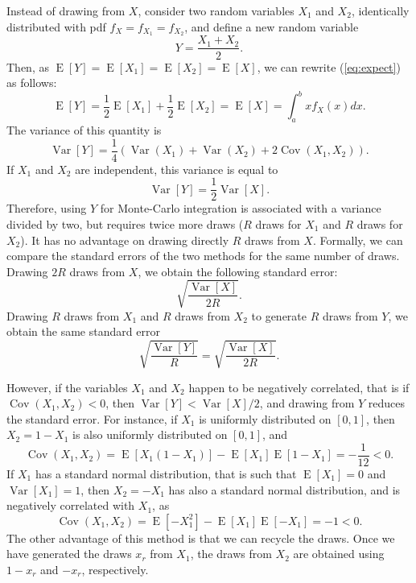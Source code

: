 \documentclass[12pt,a4paper]{article}
\newcommand{\req}[1]{(\ref{#1})}
\newcommand{\expect}{\operatorname{E}}
\newcommand{\var}{\operatorname{Var}}
\newcommand{\cov}{\operatorname{Cov}}
\begin{document}
Instead of drawing from $X$, consider two random variables $X_1$ and $X_2$, identically distributed
with pdf $f_X=f_{X_1}=f_{X_2}$, and define a new random variable
\begin{equation}
Y = \frac{X_1+X_2}{2}.
\end{equation}
 Then, as
$\expect[Y]=\expect[X_1]=\expect[X_2]=\expect[X]$, we can rewrite \req{eq:expect}
as follows:
\begin{equation}
\expect[Y] = \frac{1}{2} \expect[X_1] +
\frac{1}{2} \expect[X_2] = \expect[X] = \int_{a}^{b} x f_X(x) dx.
\end{equation}
The variance of this quantity is 
\begin{equation}
\label{eq:varY}
\var[Y] = \frac{1}{4}(\var(X_1)+\var(X_2)+2\cov(X_1,X_2)).
\end{equation}
If $X_1$ and $X_2$  are independent, this variance is equal to
\begin{equation}
\var[Y] = \frac{1}{2}\var[X].
\end{equation}
Therefore, using $Y$ for Monte-Carlo integration is associated with a
variance divided by two, but requires twice more draws ($R$ draws for $X_1$
and $R$ draws for $X_2$). It has no advantage on drawing directly $R$
draws from $X$. Formally, we can compare the standard errors of the
two methods for the same number of draws. Drawing $2R$ draws from $X$,
we obtain the following standard error:
\begin{equation}
\sqrt{\frac{\var[X]}{2R}}.
\end{equation}
Drawing $R$ draws from $X_1$ and $R$ draws from $X_2$ to generate $R$
draws from $Y$, we obtain the
same standard error
\begin{equation}
\sqrt{\frac{\var[Y]}{R}} = \sqrt{\frac{\var[X]}{2R}}. 
\end{equation}

 However, if the variables $X_1$ and
$X_2$ happen to be negatively correlated, that is if $\cov(X_1,X_2) <
0$, then $\var[Y] < \var[X] / 2$, and drawing from $Y$ reduces the
standard error. For instance, if $X_1$ is uniformly
distributed on $[0,1]$, then $X_2=1-X_1$ is also uniformly
distributed on $[0,1]$, and 
\begin{equation}
\cov(X_1,X_2)=\expect[X_1(1-X_1)]-\expect[X_1]\expect[1-X_1] =
-\frac{1}{12} < 0.
\end{equation}
If $X_1$ has a standard normal distribution, that is such that
$\expect[X_1]=0$ and $\var[X_1]=1$, then $X_2=-X_1$ has also a
standard normal distribution, and is 
negatively
correlated with $X_1$, as
\begin{equation}
\cov(X_1,X_2) = \expect[-X_1^2] - \expect[X_1]\expect[-X_1] = -1 < 0.
\end{equation}
The other advantage of this method is that we can recycle the
draws. Once we have generated the draws $x_r$ from $X_1$, the draws from $X_2$
are obtained using $1-x_r$ and $-x_r$, respectively. 
\end{document}
